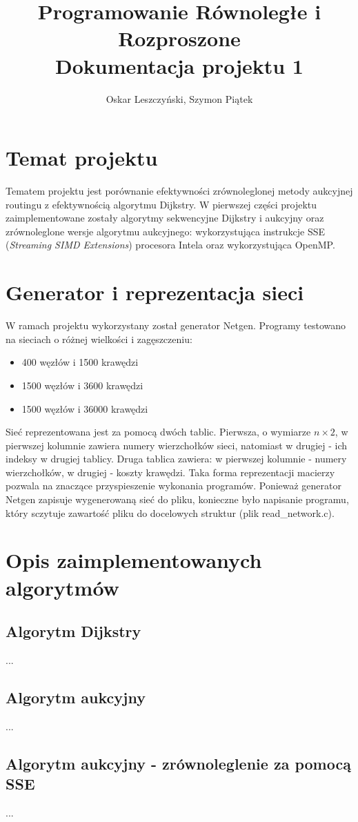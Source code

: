 \documentclass[12pt,a4paper]{article}
\title{Programowanie Równoległe i Rozproszone\\Dokumentacja projektu 1}
\author{Oskar Leszczyński, Szymon Piątek}
\begin{document}
\maketitle
\section{Temat projektu}
Tematem projektu jest porównanie efektywności zrównoleglonej metody aukcyjnej routingu z efektywnością algorytmu Dijkstry. W pierwszej części projektu zaimplementowane zostały algorytmy sekwencyjne Dijkstry i aukcyjny oraz zrównoleglone wersje algorytmu aukcyjnego: wykorzystująca instrukcje SSE (\textit{Streaming SIMD Extensions}) procesora Intela oraz wykorzystująca OpenMP.
\section{Generator i reprezentacja sieci}
W ramach projektu wykorzystany został generator Netgen. Programy testowano na sieciach o różnej wielkości i zagęszczeniu:
\begin{itemize}
\item 400 węzłów i 1500 krawędzi
\item 1500 węzłów i 3600 krawędzi
\item 1500 węzłów i 36000 krawędzi
\end{itemize}

Sieć reprezentowana jest za pomocą dwóch tablic. Pierwsza, o wymiarze $n \times 2$, w pierwszej kolumnie zawiera numery wierzchołków sieci, natomiast w drugiej - ich indeksy w drugiej tablicy. Druga tablica zawiera: w pierwszej kolumnie - numery wierzchołków, w drugiej - koszty krawędzi. Taka forma reprezentacji macierzy pozwala na znaczące przyspieszenie wykonania programów. Ponieważ generator Netgen zapisuje wygenerowaną sieć do pliku, konieczne było napisanie programu, który sczytuje zawartość pliku do docelowych struktur (plik read\_network.c).
\section{Opis zaimplementowanych algorytmów}
\subsection{Algorytm Dijkstry}
...
\subsection{Algorytm aukcyjny}
...
\subsection{Algorytm aukcyjny - zrównoleglenie za pomocą SSE}
...
\end{document}
